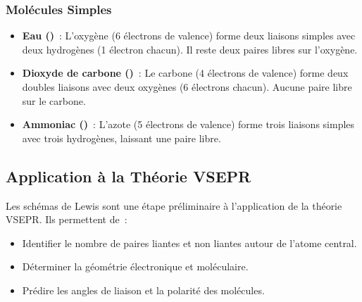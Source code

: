 \subsubsection{Molécules Simples}
\begin{itemize}
    \item \textbf{Eau ()}~:
    L'oxygène (6 électrons de valence) forme deux liaisons simples avec deux hydrogènes
    (1 électron chacun). Il reste deux paires libres sur l'oxygène.
    \begin{center}
    \end{center}

    \item \textbf{Dioxyde de carbone ()}~:
    Le carbone (4 électrons de valence) forme deux doubles liaisons avec deux oxygènes
    (6 électrons chacun). Aucune paire libre sur le carbone.
    \begin{center}
    \end{center}

    \item \textbf{Ammoniac ()}~:
    L'azote (5 électrons de valence) forme trois liaisons simples avec trois hydrogènes, 
    laissant une paire libre.
    \vspace{0.5cm}
   \begin{center}
    \end{center}
\end{itemize}

\subsection{Application à la Théorie VSEPR}
Les schémas de Lewis sont une étape préliminaire à l'application de la théorie VSEPR. Ils permettent de~:
\begin{itemize}
    \item Identifier le nombre de paires liantes et non liantes autour de l'atome central.
    \item Déterminer la géométrie électronique et moléculaire.
    \item Prédire les angles de liaison et la polarité des molécules.
\end{itemize}
